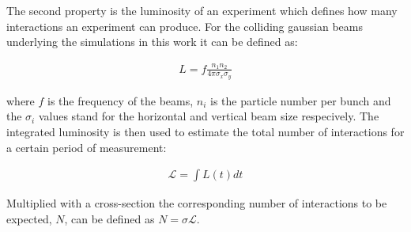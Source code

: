 The second property is the luminosity of an experiment which defines how many interactions an experiment can produce. For the colliding gaussian beams underlying the simulations in this work it can be defined as:

\begin{align}
L =f \frac{n_1 n_2}{4 \pi \sigma_x \sigma_y}
\end{align}

where $f$ is the frequency of the beams, $n_i$ is the particle number per bunch and the $\sigma_i$ values stand for the horizontal and vertical beam size respecively.
The integrated luminosity is then used to estimate the total number of interactions for a certain period of measurement:

\begin{align}
\mathcal{L} = \int L(t) dt
\end{align}

Multiplied with a cross-section the corresponding number of interactions to be expected, $N$, can be defined as $N = \sigma \mathcal{L}$.


